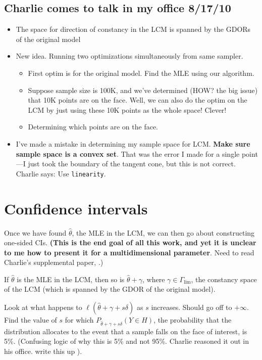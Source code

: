 \documentclass{amsbook}
\theoremstyle{definition}
\theoremstyle{remark}
\begin{document}
\subsection{Charlie comes to talk in my office 8/17/10}
\begin{itemize}
\item The space for direction of constancy in the LCM is spanned by the GDORs of the original model
\item New idea.  Running two optimizations simultaneously from same sampler.
	\begin{itemize}
		\item First optim is for the original model.  Find the MLE using our algorithm.
		\item Suppose sample size is 100K, and we've determined (HOW?  the big issue) that 10K points are on the face.  Well, we can also do the optim on the LCM by just using these 10K points as the whole space!  Clever!
		\item Determining which points are on the face.
	\end{itemize}
\item I've made a mistake in determining my sample space for LCM.  \textbf{Make sure sample space is a convex set}.  That was the error I made for a single point---I just took the boundary of the tangent cone, but this is not correct.  Charlie says: Use \texttt{linearity}.
\end{itemize}

\section{Confidence intervals}
Once we have found $\hat{\theta}$, the MLE in the LCM, we can then go about constructing one-sided CIs.  \textbf{(This is the end goal of all this work, and yet it is unclear to me how to present it for a multidimensional parameter}.  Need to read Charlie's supplemental paper, \citet{geyer:2008}.)

If $\hat{\theta}$ is the MLE in the LCM, then so is $\hat{\theta} + \gamma$, where
$\gamma \in \Gamma_{\lim}$, the constancy space of the LCM (which is spanned by the GDOR of the original model).

Look at what happens to $\ell(\hat{\theta} + \gamma + s \delta)$ as $s$ increases.  Should go off to $+\infty$.  Find the value of $s$ for which $P_{\hat{\theta} + \gamma + s \delta}(Y \in H )$, the probability that the distribution allocates to the event that a sample falls on the face of interest, is 5\%. (Confusing logic of why this is 5\% and not 95\%.  Charlie reasoned it out in his office.  write this up ).
\end{document}
